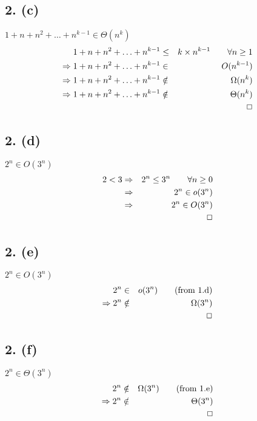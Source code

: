 \documentclass{article}[12pt]
\begin{document}
\subsection*{2. (c)}
  $1 + n + n^{2} + \ldots + n^{k-1} \in \Theta(n^{k})$ 
  \begin{eqnarray*}
    1 + n + n^{2} + \ldots + n^{k-1}                & \leq      & k \times n^{k-1} \qquad \forall n \geq 1 \\
    \Rightarrow 1 + n + n^{2} + \ldots + n^{k-1}    & \in       & O(n^{k-1}) \\
    \Rightarrow 1 + n + n^{2} + \ldots + n^{k-1}    & \notin    & \Omega(n^{k}) \\
    \Rightarrow 1 + n + n^{2} + \ldots + n^{k-1}    & \notin    & \Theta(n^{k}) \\
    &           & \indent \indent \indent \Box \\
  \end{eqnarray*}

\subsection*{2. (d)}
  $2^{n} \in O(3^{n})$ 
  \begin{eqnarray*}
      2 < 3 & \Rightarrow & 2^{n} \leq 3^{n} \qquad \forall n \geq 0 \\
            & \Rightarrow & 2^{n} \in o(3^{n}) \\
            & \Rightarrow & 2^{n} \in O(3^{n}) \\
            &             & \indent \indent \indent \indent \Box \\
  \end{eqnarray*}

\subsection*{2. (e)}
  $2^{n} \in O(3^{n})$ 
  \begin{eqnarray*}
    2^{n}                 & \in       & o(3^{n}) \qquad \textrm{(from 1.d)} \\
    \Rightarrow 2^{n}     & \notin    & \Omega(3^{n}) \\
                          &           & \indent \indent \indent \Box \\
  \end{eqnarray*}

\subsection*{2. (f)}
  $2^{n} \in \Theta(3^{n})$ 
  \begin{eqnarray*}
    2^{n}                 & \notin    & \Omega(3^{n}) \qquad \textrm{(from 1.e)} \\
    \Rightarrow 2^{n}     & \notin    & \Theta(3^{n}) \\
                          &           & \indent \indent \indent \Box \\
  \end{eqnarray*}
\end{document}
